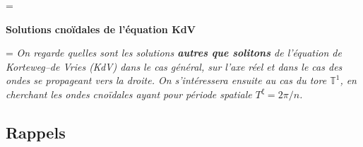 \documentclass[10pt,a4paper, oneside, fleqn]{myarticle}
\newcommand{\Tset}{\mathbb{T}}
\begin{document}
\newdimen\oldparindent\oldparindent=\parindent\
%
%

\begin{center}
  {\huge \bfseries \sffamily Solutions cnoïdales de  l'équation KdV
  }
\bigskip

  
\begin{minipage}{.9\textwidth}\parindent=\oldparindent
  \slshape \indent On regarde quelles sont les solutions \textbf{autres que solitons} de l'équation de Korteweg--de Vries (KdV) dans le cas général, sur l'axe réel et dans le cas des ondes se propageant vers la droite. On s'intéressera ensuite au cas du tore $\Tset^1$, en cherchant les ondes cnoïdales ayant pour période spatiale $T^\xi = 2\pi/n$.



\end{minipage}
\end{center}
%
%


\subsection*{Rappels}
\end{document}
